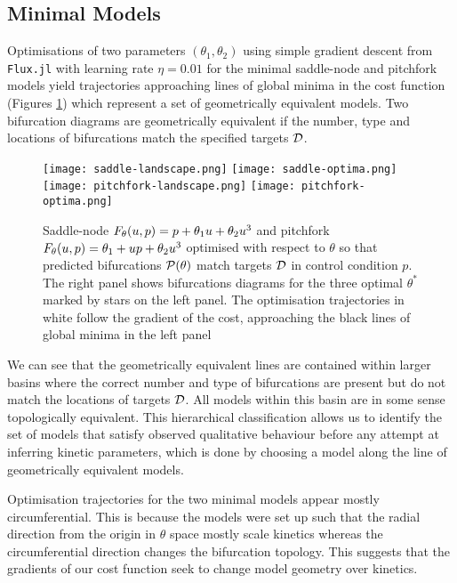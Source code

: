 \subsection{Minimal Models}
Optimisations of two parameters $(\theta_1,\theta_2)$ using simple gradient descent from \texttt{Flux.jl} with learning rate $\eta=0.01$ for the minimal saddle-node and pitchfork models yield trajectories approaching lines of global minima in the cost function (Figures \ref{fig:minimal-models:results}) which represent a set of geometrically equivalent models. Two bifurcation diagrams are geometrically equivalent if the number, type and locations of bifurcations match the specified targets $\mathcal{D}$.

\begin{figure}[ht]
\centering
\texttt{[image: saddle-landscape.png]}
\texttt{[image: saddle-optima.png]}
\texttt{[image: pitchfork-landscape.png]}
\texttt{[image: pitchfork-optima.png]}
\caption{Saddle-node $F_{\theta}(u,p) = p + \theta_{1}u+\theta_{2}u^3$ and pitchfork $F_{\theta}(u,p) = \theta_{1} + u p +\theta_{2}u^3$ optimised with respect to $\theta$ so that predicted bifurcations $\mathcal{P}(\theta)$ match targets $\mathcal{D}$ in control condition $p$. The right panel shows bifurcations diagrams for the three optimal $\theta^*$ marked by stars on the left panel. The optimisation trajectories in white follow the gradient of the cost, approaching the black lines of global minima in the left panel}
\label{fig:minimal-models:results}
\end{figure}

We can see that the geometrically equivalent lines are contained within larger basins where the correct number and type of bifurcations are present but do not match the locations of targets $\mathcal{D}$. All models within this basin are in some sense topologically equivalent. This hierarchical classification allows us to identify the set of models that satisfy observed qualitative behaviour \cite{Stumpf2019ParameterBifurcations} before any attempt at inferring kinetic parameters, which is done by choosing a model along the line of geometrically equivalent models.

Optimisation trajectories for the two minimal models appear mostly circumferential. This is because the models were set up such that the radial direction from the origin in $\theta$ space mostly scale kinetics whereas the circumferential direction changes the bifurcation topology. This suggests that the gradients of our cost function seek to change model geometry over kinetics.

